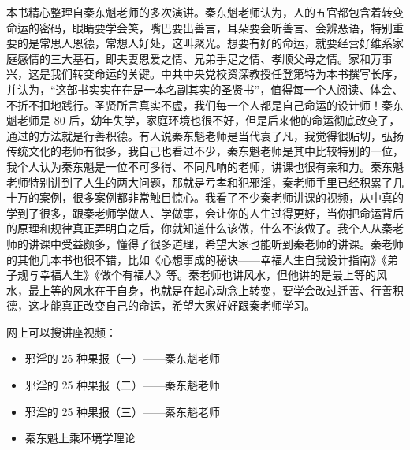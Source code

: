 \begin{book}
    本书精心整理自秦东魁老师的多次演讲。秦东魁老师认为，人的五官都包含着转变命运的密码，眼睛要学会笑，嘴巴要出善言，耳朵要会听善言、会辨恶语，特别重要的是常思人恩德，常想人好处，这叫聚光。想要有好的命运，就要经营好维系家庭感情的三大基石，即夫妻恩爱之情、兄弟手足之情、孝顺父母之情。家和万事兴，这是我们转变命运的关键。中共中央党校资深教授任登第特为本书撰写长序，并认为，“这部书实实在在是一本名副其实的圣贤书”，值得每一个人阅读、体会、不折不扣地践行。圣贤所言真实不虚，我们每一个人都是自己命运的设计师！秦东魁老师是 80 后，幼年失学，家庭环境也很不好，但是后来他的命运彻底改变了，通过的方法就是行善积德。有人说秦东魁老师是当代袁了凡，我觉得很贴切，弘扬传统文化的老师有很多，我自己也看过不少，秦东魁老师是其中比较特别的一位，我个人认为秦东魁是一位不可多得、不同凡响的老师，讲课也很有亲和力。秦东魁老师特别讲到了人生的两大问题，那就是亏孝和犯邪淫，秦老师手里已经积累了几十万的案例，很多案例都非常触目惊心。我看了不少秦老师讲课的视频，从中真的学到了很多，跟秦老师学做人、学做事，会让你的人生过得更好，当你把命运背后的原理和规律真正弄明白之后，你就知道什么该做，什么不该做了。我个人从秦老师的讲课中受益颇多，懂得了很多道理，希望大家也能听到秦老师的讲课。秦老师的其他几本书也很不错，比如《心想事成的秘诀——幸福人生自我设计指南》《弟子规与幸福人生》《做个有福人》等。秦老师也讲风水，但他讲的是最上等的风水，最上等的风水在于自身，也就是在起心动念上转变，要学会改过迁善、行善积德，这才能真正改变自己的命运，希望大家好好跟秦老师学习。

    网上可以搜讲座视频：\begin{itemize}
        \item 邪淫的 25 种果报（一）——秦东魁老师
        \item 邪淫的 25 种果报（二）——秦东魁老师
        \item 邪淫的 25 种果报（三）——秦东魁老师
        \item 秦东魁上乘环境学理论
    \end{itemize}
\end{book}
